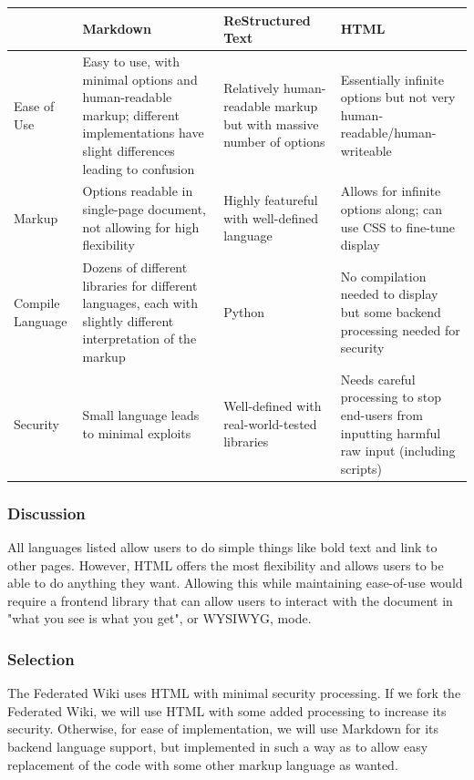 \documentclass[onecolumn, draftclsnofoot,10pt, compsoc]{IEEEtran}
\begin{document}
{\tablehead{}
\begin{supertabular}{|p{2.5cm}|p{4.5cm}|p{4.5cm}|p{4.5cm}|}
\hline
	& Markdown
	& ReStructured Text
	& HTML \\ 
\hline
	Ease of Use
	& Easy to use, with minimal options and human-readable markup; 
		different implementations have slight differences leading to confusion
	& Relatively human-readable markup but with massive number of options
	& Essentially infinite options but not very human-readable/human-writeable  \\ 
\hline
	Markup
	& Options readable in single-page document, not allowing for high flexibility
	& Highly featureful with well-defined language
	& Allows for infinite options along; can use CSS to fine-tune display \\ 
\hline
	Compile Language
	& Dozens of different libraries for different languages, 
		each with slightly different interpretation of the markup
	& Python
	& No compilation needed to display but some backend processing needed for security \\ 
\hline
	Security
	& Small language leads to minimal exploits
	& Well-defined with real-world-tested libraries
	& Needs careful processing to stop end-users from inputting 
		harmful raw input (including scripts)\\ 
\hline
\end{supertabular}

\medskip

\subsubsection{Discussion}
\noindent
All languages listed allow users to do simple things like bold text and link to other pages. However,
HTML offers the most flexibility and allows users to be able to do anything they want.
Allowing this while maintaining ease-of-use would require a frontend library
that can allow users to interact with the document in "what you see is what you get",
or WYSIWYG, mode.

\medskip

\subsubsection{Selection}
\noindent
The Federated Wiki uses HTML with minimal security processing. If we fork the Federated Wiki, we will use
HTML with some added processing to increase its security. Otherwise, for ease of implementation, we will
use Markdown for its backend language support, but implemented in such a way as to allow easy
replacement of the code with some other markup language as wanted.










}
\end{document}
